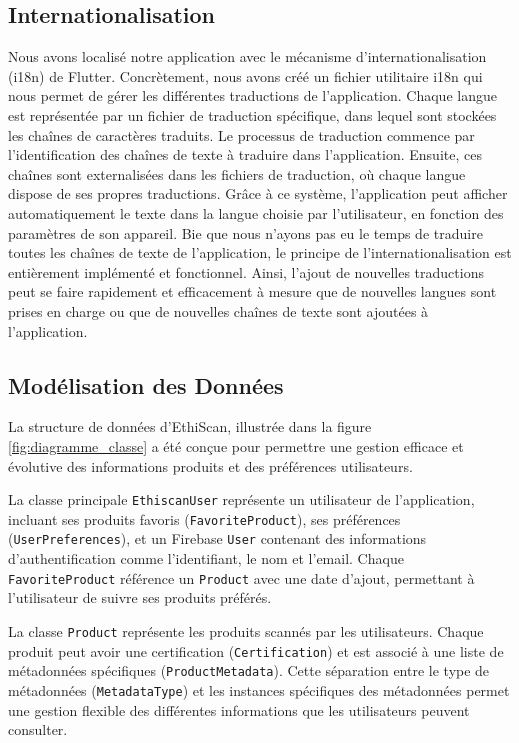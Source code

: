 \subsection{Internationalisation}
\label{sec:i18n}

Nous avons localisé notre application avec le mécanisme d'internationalisation (i18n) de Flutter. Concrètement, nous avons créé un fichier utilitaire i18n qui nous permet de gérer les différentes traductions de l'application. Chaque langue est représentée par un fichier de traduction spécifique, dans lequel sont stockées les chaînes de caractères traduits. Le processus de traduction commence par l'identification des chaînes de texte à traduire dans l'application. Ensuite, ces chaînes sont externalisées dans les fichiers de traduction, où chaque langue dispose de ses propres traductions. Grâce à ce système, l'application peut afficher automatiquement le texte dans la langue choisie par l'utilisateur, en fonction des paramètres de son appareil. Bie que nous n'ayons pas eu le temps de traduire toutes les chaînes de texte de l'application, le principe de l'internationalisation est entièrement implémenté et fonctionnel. Ainsi, l'ajout de nouvelles traductions peut se faire rapidement et efficacement à mesure que de nouvelles langues sont prises en charge ou que de nouvelles chaînes de texte sont ajoutées à l'application.

\subsection{Modélisation des Données}
\label{sec:data_model}

La structure de données d'EthiScan, illustrée dans la figure \ref{fig:diagramme_classe} a été conçue pour permettre une gestion efficace et évolutive des informations produits et des préférences utilisateurs.

La classe principale \texttt{EthiscanUser} représente un utilisateur de l'application, incluant ses produits favoris (\texttt{FavoriteProduct}), ses préférences (\texttt{UserPreferences}), et un Firebase \texttt{User} contenant des informations d'authentification comme l'identifiant, le nom et l'email. Chaque \texttt{FavoriteProduct} référence un \texttt{Product} avec une date d'ajout, permettant à l'utilisateur de suivre ses produits préférés.

La classe \texttt{Product} représente les produits scannés par les utilisateurs. Chaque produit peut avoir une certification (\texttt{Certification}) et est associé à une liste de métadonnées spécifiques (\texttt{ProductMetadata}). Cette séparation entre le type de métadonnées (\texttt{MetadataType}) et les instances spécifiques des métadonnées permet une gestion flexible des différentes informations que les utilisateurs peuvent consulter.

